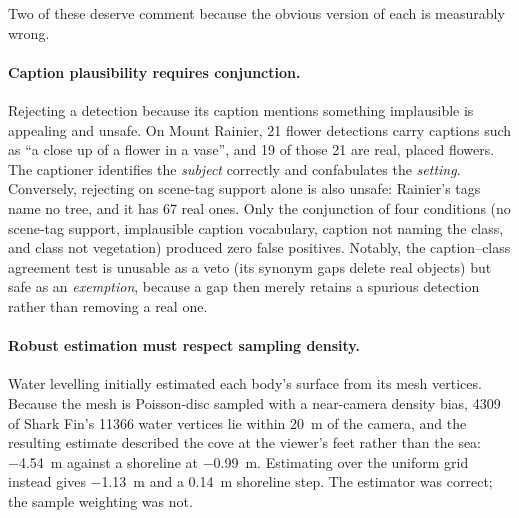 Two of these deserve comment because the obvious version of each is measurably
wrong.

\paragraph{Caption plausibility requires conjunction.}
Rejecting a detection because its caption mentions something implausible is
appealing and unsafe. On Mount Rainier, 21 flower detections carry captions such as
``a close up of a flower in a vase'', and \num{19} of those \num{21} are real,
placed flowers. The captioner identifies the \emph{subject} correctly and
confabulates the \emph{setting}. Conversely, rejecting on scene-tag support alone
is also unsafe: Rainier's tags name no tree, and it has \num{67} real ones. Only
the conjunction of four conditions (no scene-tag support, implausible caption
vocabulary, caption not naming the class, and class not vegetation) produced
zero false positives. Notably, the caption--class agreement test is unusable as a
veto (its synonym gaps delete real objects) but safe as an \emph{exemption}, because
a gap then merely retains a spurious detection rather than removing a real one.

\paragraph{Robust estimation must respect sampling density.}
Water levelling initially estimated each body's surface from its mesh vertices.
Because the mesh is Poisson-disc sampled with a near-camera density bias,
\num{4309} of Shark Fin's \num{11366} water vertices lie within \SI{20}{\meter} of
the camera, and the resulting estimate described the cove at the viewer's feet
rather than the sea: \SI{-4.54}{\meter} against a shoreline at
\SI{-0.99}{\meter}. Estimating over the uniform grid instead gives
\SI{-1.13}{\meter} and a \SI{0.14}{\meter} shoreline step. The estimator was
correct; the sample weighting was not.
